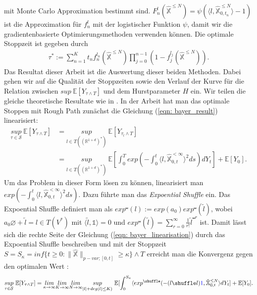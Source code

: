 \documentclass[12pt,titlepage,headsepline]{article}
\begin{document}
    mit Monte Carlo Approximation bestimmt sind. $F_n^l(\hat{\mathbb{X}}^{\leq N}) = \psi( \langle l, \hat{\mathbb{X}}^{\leq N}_{0,t_n} \rangle - 1)$ ist die Approximation für $f_n^l$ mit der logistischer Funktion $\psi$, damit wir die gradientenbasierte Optimierungsmethoden verwenden können. Die optimale Stoppzeit ist gegeben durch
    \begin{align*}
      \tau^* := \sum_{n=1}^K t_nf_n^{l_n}(\hat{\mathbb{X}}^{\leq N})\prod_{j=0}^{n-1}(1-f_j^{l_j}(\hat{\mathbb{X}}^{\leq N})).
    \end{align*}
    Das Resultat dieser Arbeit ist die Auswertung dieser beiden Methoden. Dabei gehen wir auf die Qualität der Stoppzeiten sowie den Verlauf der Kurve für die Relation zwischen $sup \ \mathbb{E}[Y_{\tau \land T}]$ und dem Hurstparameter $H$ ein.
    \hfill\break
    Wir teilen die gleiche theoretische Resultate wie in \cite{bayer_optimal_2020}. In der Arbeit hat man das optimale Stoppen mit Rough Path zunächst die Gleichung (\ref{eqn: bayer_result}) linearisiert:
    \begin{align}\label{eqn: bayer_linearisation}
       \underset{\tau \in \mathcal{S}}{sup} \ \mathbb{E}[Y_{\tau \land T}] &= \underset{l \in T((\mathbb{R}^{1+d})^*)}{sup} \ \mathbb{E}[Y_{\tau_l \land T}] \\
       &= \underset{l \in T((\mathbb{R}^{1+d})^*)}{sup} \ \mathbb{E}[\int_0^T exp(-\int_0^t \langle l,\hat{\mathbb{X}}^{<\infty}_{0,t}\rangle ^2 ds) dY_t] + \mathbb{E}[Y_0].
    \end{align}
    Um das Problem in dieser Form lösen zu können, linearisiert man $exp(-\int_0^t \langle l,\hat{\mathbb{X}}^{<\infty}_{0,t}\rangle ^2 ds)$. Dazu führte man das \textit{Expoential Shuffle} ein. Das Expoential Shuffle definiert man als $exp^{\shuffle}(l):=exp(a_0)exp^{\shuffle}(\tilde{l})$, wobei $a_0\varnothing + \tilde{l} = l \in T(V^*)$ mit
    $\langle \tilde{l}, \mathds{1} \rangle = 0$ und $exp^{\shuffle}(\tilde{l}) = \sum_{r=0}^{\infty}\frac{1}{r!}\tilde{l}^{\shuffle r}$ ist. Damit lässt sich die rechte Seite der Gleichung (\ref{eqn: bayer_linearisation}) durch das Expoential Shuffle beschreiben und mit der Stoppzeit
    $S = S_{\kappa}=inf\{t \geq 0 : \lVert \hat{\mathbb{X}} \rVert_{p-var;[0,t]} \geq \kappa\}\wedge T$
    erreicht man die Konvergenz gegen den optimalen Wert \cite{bayer_optimal_2020,Prop.6.5}:
    \begin{align*}
      \underset{\tau \in \mathcal{S}}{sup} \ \mathbb{E}[Y_{\tau \land T}] = \underset{\kappa \rightarrow \infty}{lim} \underset{K \rightarrow \infty}{lim} \underset{N \rightarrow \infty}{lim} \underset{\lvert l \rvert + deg(l) \leq K)}{sup} \ \mathbb{E}[\int_0^{S_{\kappa}} \langle exp^{\shuffle}(-(l \shuffle l)\textcolor{blue}{1},\hat{\mathbb{X}}^{\leq N}_{0,t}\rangle dY_t] + \mathbb{E}[Y_0].
    \end{align*}
\end{document}

